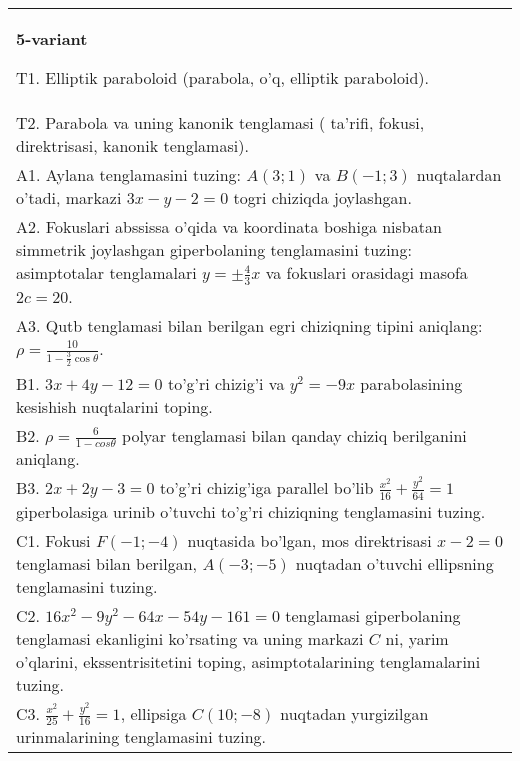 \documentclass{article}
\begin{document}
\begin{tabular}{m{17cm}}
\textbf{5-variant}
\newline

T1. Elliptik paraboloid (parabola, o'q, elliptik paraboloid).\\

T2. Parabola va uning kanonik tenglamasi ( ta'rifi, fokusi, direktrisasi, kanonik tenglamasi).\\

A1. Aylana tenglamasini tuzing: $A(3;1)$ va $B(-1;3)$ nuqtalardan o'tadi, markazi $3x-y-2=0$ togri chiziqda joylashgan.\\

A2. Fokuslari abssissa o'qida va koordinata boshiga nisbatan simmetrik joylashgan giperbolaning tenglamasini tuzing: asimptotalar tenglamalari $y=\pm \frac{4}{3}x$ va fokuslari orasidagi masofa $2c=20$.\\

A3. Qutb tenglamasi bilan berilgan egri chiziqning tipini aniqlang: $\rho=\frac{10}{1-\frac{3}{2}\cos\theta}$.\\

B1. $3x + 4y - 12 = 0$ to'g'ri chizig'i va $y^{2} = - 9x$ parabolasining kesishish nuqtalarini toping.\\

B2. $\rho = \frac{6}{1 - cos\theta}$ polyar tenglamasi bilan qanday chiziq berilganini aniqlang.  \\

B3. $2x + 2y - 3 = 0$ to'g'ri chizig'iga parallel bo'lib $\frac{x^{2}}{16} + \frac{y^{2}}{64} = 1$ giperbolasiga urinib o'tuvchi to'g'ri chiziqning tenglamasini tuzing.  \\

C1. Fokusi $F( - 1; - 4)$ nuqtasida bo'lgan, mos direktrisasi $x - 2 = 0$ tenglamasi bilan berilgan, $A( - 3; - 5)$ nuqtadan o'tuvchi ellipsning tenglamasini tuzing.  \\

C2. $16x^{2} - 9y^{2} - 64x - 54y - 161 = 0$ tenglamasi giperbolaning tenglamasi ekanligini ko'rsating va uning markazi $C$ ni, yarim o'qlarini, ekssentrisitetini toping, asimptotalarining tenglamalarini tuzing.  \\

C3. $\frac{x^{2}}{25} + \frac{y^{2}}{16} = 1$, ellipsiga $C(10; - 8)$ nuqtadan yurgizilgan urinmalarining tenglamasini tuzing.  \\

\end{tabular}
\vspace{1cm}
\end{document}
